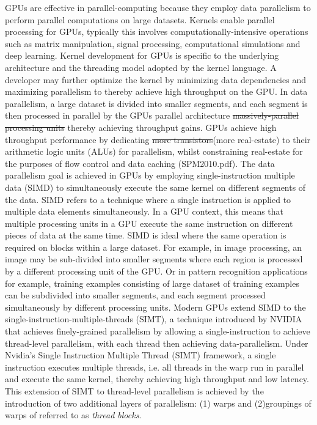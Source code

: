 \documentclass[10pt]{article}[draft]
\begin{document}
GPUs are effective in parallel-computing because they employ data parallelism to perform parallel computations on large datasets. Kernels enable parallel processing for GPUs, typically this involves computationally-intensive operations such as matrix manipulation, signal processing, computational simulations and deep learning. Kernel development for GPUs is specific to the underlying architecture and the threading model adopted by the kernel language. A developer may further optimize the kernel by minimizing data dependencies and maximizing parallelism  to thereby achieve high throughput on the GPU. In data parallelism, a large dataset is divided into smaller segments, and each segment is  then processed in parallel by the GPUs parallel architecture \st{massively-parallel processing units} thereby achieving throughput gains. GPUs achieve high throughput  performance by dedicating \st{more transistors}(more real-estate) to their arithmetic logic units (ALUs) for parallelism, whilst constraining real-estate for the purposes of flow control and data caching (SPM2010.pdf). The data parallelism goal is achieved in GPUs by employing single-instruction multiple data (SIMD) to simultaneously execute the same kernel on different segments of the data. SIMD refers to a technique where a single instruction is applied to multiple data elements simultaneously. In a GPU context, this means that multiple processing units in a GPU execute the same instruction on different pieces of data at the same time. SIMD is ideal where the same operation is required on blocks within a large dataset. For example, in image processing, an image may be sub-divided into smaller segments where each region is  processed by a different processing unit of the GPU. Or in pattern recognition applications for example, training examples consisting of large dataset of training examples can be subdivided into smaller segments, and each segment  processed simultaneously by different processing units. Modern GPUs extend SIMD to the single-instruction-multiple-threads (SIMT), a technique introduced by NVIDIA that achieves finely-grained parallelism by allowing a single-instruction to achieve thread-level parallelism, with each thread then achieving data-parallelism.  Under Nvidia's Single Instruction Multiple Thread (SIMT) framework, a single instruction executes multiple threads, i.e. all threads in  the warp  run in parallel and execute the same kernel, thereby achieving high throughput and low latency. This extension of SIMT to thread-level parallelism is achieved by the introduction of two additional layers of parallelism: (1) warps and (2)groupings of warps of referred to as \emph{thread blocks}.
\end{document}
